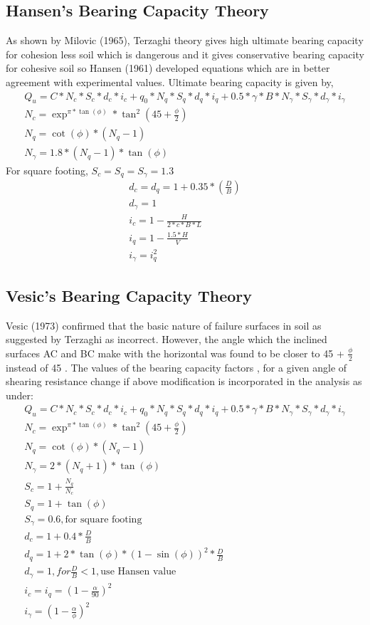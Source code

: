 \subsection{Hansen’s Bearing Capacity Theory}
As shown by Milovic (1965), Terzaghi theory gives high ultimate bearing capacity for cohesion less soil which is dangerous and it gives conservative bearing capacity for cohesive soil so Hansen (1961) developed equations which are in better agreement with experimental values. Ultimate bearing capacity is given by, \cite{arora_soil_2004}
\begin{gather}
Q_u = C * N_c * S_c * d_c * i_c + q_0 * N_q * S_q * d_q * i_q + 0.5 * {\gamma} * B * N_{\gamma}*S_{\gamma}*d_{\gamma} * i_{\gamma}\\
N_c = \exp^{\pi * \tan(\phi)} * \tan^2 ( 45 + \frac{\phi}{2} )\\
N_q = \cot(\phi)*(N_q - 1)\\
N_{\gamma} = 1.8 * (N_q-1) * \tan(\phi)
\end{gather}
For square footing,
$S_c = S_q = S_{\gamma} = 1.3$
\begin{gather}
d_c=d_q = 1+0.35*(\frac{D}{B})\\
d_{\gamma} = 1\\
i_c=1 - \frac{H}{2*c*B*L}\\
i_q=1 - \frac{1.5*H}{V}\\
i_{\gamma} = i_q^2  
\end{gather}

\subsection{Vesic's Bearing Capacity Theory}
Vesic (1973) confirmed that the basic nature of failure surfaces in soil as suggested by Terzaghi as incorrect. However, the angle which the inclined surfaces AC and BC make with the horizontal was found to be closer to 45 + $\frac{\phi}{2}$ instead of 45 . The values of the bearing capacity factors , for a given angle of shearing resistance change if above modification is incorporated in the analysis as under: \cite{arora_soil_2004}
\begin{gather}
Q_u = C * N_c * S_c * d_c * i_c + q_0 * N_q * S_q * d_q * i_q + 0.5 * {\gamma} * B * N_{\gamma}*S_{\gamma}*d_{\gamma} * i_{\gamma}\\
N_c = \exp^{\pi * \tan(\phi)} * \tan^2 ( 45 + \frac{\phi}{2} )\\
N_q = \cot(\phi)*(N_q - 1)\\
N_{\gamma} = 2 * (N_q+1) * \tan(\phi)\\
S_c = 1 + \frac{N_q}{N_c}\\
S_q = 1+ \tan(\phi)\\
S_{\gamma} = 0.6, \text{for square footing}\\
d_c=1+0.4*\frac{D}{B}\\
d_q= 1 + 2 * \tan(\phi)*(1-\sin(\phi) )^2*\frac{D}{B}\\
d_{\gamma} = 1 , for \frac{D}{B}<1 , \text{use Hansen value}\\
i_c=i_q = (1-\frac{\alpha}{90})^2\\
i_{\gamma}=(1-\frac{\alpha}{\phi})^2
\end{gather}

